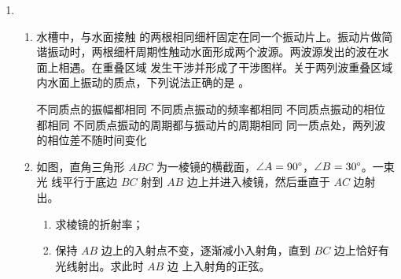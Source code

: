 

\begin{enumerate}
	\item

\begin{enumerate}
	\item
水槽中，与水面接触 的两根相同细杆固定在同一个振动片上。振动片做简
谐振动时，两根细杆周期性触动水面形成两个波源。两波源发出的波在水面上相遇。在重叠区域
发生干涉并形成了干涉图样。关于两列波重叠区域内水面上振动的质点，下列说法正确的是 \underlinegap 
。


\fivechoices
{不同质点的振幅都相同}
{不同质点振动的频率都相同}
{不同质点振动的相位都相同}
{不同质点振动的周期都与振动片的周期相同}
{同一质点处，两列波的相位差不随时间变化}



\item 
如图，直角三角形 $ ABC $ 为一棱镜的横截面，$ \angle A=90 \degree $，$ \angle B=30 \degree $。一束光
线平行于底边 $ BC $ 射到 $ AB $ 边上并进入棱镜，然后垂直于 $ AC $ 边射出。
\begin{enumerate}
	\item
求棱镜的折射率；

\item 
保持 $ AB $ 边上的入射点不变，逐渐减小入射角，直到 $ BC $ 边上恰好有光线射出。求此时 $ AB $ 边
上入射角的正弦。

\end{enumerate}
\begin{figure}[h!]
	\flushright
	
\end{figure}

	


\end{enumerate}
\end{enumerate}
